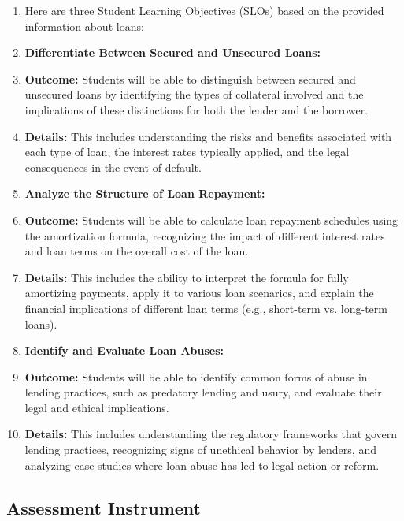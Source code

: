 \begin{enumerate}
    \item Here are three Student Learning Objectives (SLOs) based on the provided information about loans:
    \item \textbf{Differentiate Between Secured and Unsecured Loans:}
    \item \textbf{Outcome:} Students will be able to distinguish between secured and unsecured loans by identifying the types of collateral involved and the implications of these distinctions for both the lender and the borrower.
    \item \textbf{Details:} This includes understanding the risks and benefits associated with each type of loan, the interest rates typically applied, and the legal consequences in the event of default.
    \item \textbf{Analyze the Structure of Loan Repayment:}
    \item \textbf{Outcome:} Students will be able to calculate loan repayment schedules using the amortization formula, recognizing the impact of different interest rates and loan terms on the overall cost of the loan.
    \item \textbf{Details:} This includes the ability to interpret the formula for fully amortizing payments, apply it to various loan scenarios, and explain the financial implications of different loan terms (e.g., short-term vs. long-term loans).
    \item \textbf{Identify and Evaluate Loan Abuses:}
    \item \textbf{Outcome:} Students will be able to identify common forms of abuse in lending practices, such as predatory lending and usury, and evaluate their legal and ethical implications.
    \item \textbf{Details:} This includes understanding the regulatory frameworks that govern lending practices, recognizing signs of unethical behavior by lenders, and analyzing case studies where loan abuse has led to legal action or reform.
\end{enumerate}


\subsection{Assessment Instrument}
\label{ssec:asse-3669}


